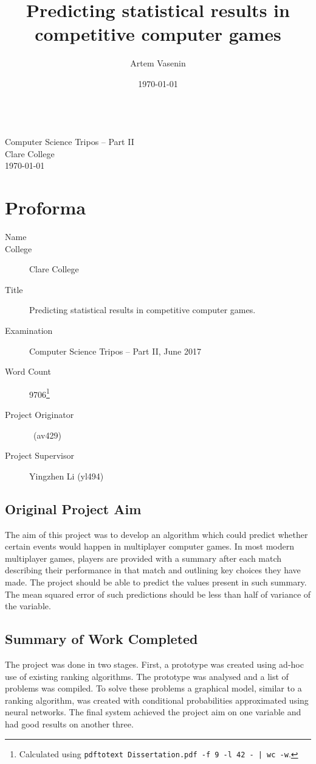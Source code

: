 \documentclass[12pt,a4paper]{book}
\title{Predicting statistical results in competitive computer games}
\author{Artem Vasenin}
\date{\today}
\newcommand\college{Clare College}
\begin{document}
\frontmatter


\pagestyle{empty}

\rightline{\LARGE \textbf{\@author}}

\vspace*{60mm}
\begin{center}
\Huge
\textbf{\@title} \\[5mm]
Computer Science Tripos -- Part II \\[5mm]
\college \\[5mm]
\today  %
\end{center}



\cleardoublepage
\pagestyle{plain}
\section*{Proforma}
\begin{description}
\item[Name] \@author
\item[College] \college
\item[Title] Predicting statistical results in competitive computer games.
\item[Examination] Computer Science Tripos -- Part II, June 2017
\item[Word Count] 9706\footnote{Calculated using \texttt{pdftotext Dissertation.pdf -f 9 -l 42  - | wc -w}.} %
\item[Project Originator] \@author\ (av429)
\item[Project Supervisor] Yingzhen Li (yl494)
\end{description}

\subsection*{Original Project Aim}
The aim of this project was to develop an algorithm which could predict whether certain events would happen in multiplayer computer games.
In most modern multiplayer games, players are provided with a summary after each match describing their performance in that match and outlining key choices they have made.
The project should be able to predict the values present in such summary.
The mean squared error of such predictions should be less than half of variance of the variable.
\subsection*{Summary of Work Completed}
The project was done in two stages.
First, a prototype was created using ad-hoc use of existing ranking algorithms.
The prototype was analysed and a list of problems was compiled. 
To solve these problems a graphical model, similar to a ranking algorithm, was created with conditional probabilities approximated using neural networks.
The final system achieved the project aim on one variable and had good results on another three.
\end{document}
